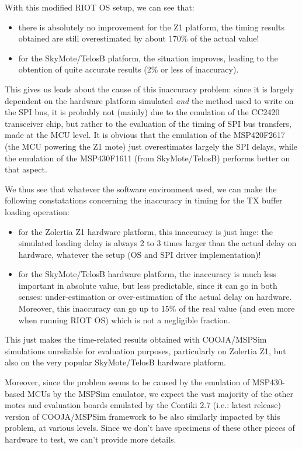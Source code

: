 \documentclass[a4paper,10pt]{article}
\begin{document}
With this modified RIOT OS setup, we can see that:
\begin{itemize}
\item there is absolutely no improvement for the Z1 platform, the timing
results obtained are still overestimated by about 170\% of the actual value!
\item for the SkyMote/TelosB platform, the situation improves, leading to
the obtention of quite accurate results (2\% or less of inaccuracy).
\end{itemize}
This gives us leads about the cause of this inaccuracy problem: since it
is largely dependent on the hardware platform simulated \emph{and} the method
used to write on the SPI bus, it is probably not (mainly) due to the
emulation of the CC2420 transceiver chip, but rather to the evaluation of
the timing of SPI bus transfers, made at the MCU level. It is obvious that
the emulation of the MSP420F2617 (the MCU powering the Z1 mote) just
overestimates largely the SPI delays, while the emulation of the MSP430F1611
(from SkyMote/TelosB) performs better on that aspect.

\medskip

We thus see that whatever the software environment used, we can make the
following constatations concerning the inaccuracy in timing for the TX buffer
loading operation:
\begin{itemize}
\item for the Zolertia Z1 hardware platform, this inaccuracy is just huge:
the simulated loading delay is always 2 to 3 times larger than the actual
delay on hardware, whatever the setup (OS and SPI driver implementation)!
\item for the SkyMote/TelosB hardware platform, the inaccuracy is much less
important in absolute value, but less predictable, since it can go in both
senses: under-estimation or over-estimation of the actual delay on hardware.
Moreover, this inaccuracy can go up to 15\% of the real value (and even more
when running RIOT OS) which is not a negligible fraction.
\end{itemize}
This just makes the time-related results obtained with COOJA/MSPSim
simulations unreliable for evaluation purposes, particularly on Zolertia Z1,
but also on the very popular SkyMote/TelosB hardware platform.

Moreover, since the problem seems to be caused by the emulation of
MSP430-based MCUs by the MSPSim emulator, we expect the vast majority
of the other motes and evaluation boards emulated by the Contiki 2.7
(i.e.: latest release) version of COOJA/MSPSim framework to be also similarly
impacted by this problem, at various levels. Since we don't have specimens
of these other pieces of hardware to test, we can't provide more details.
\end{document}
